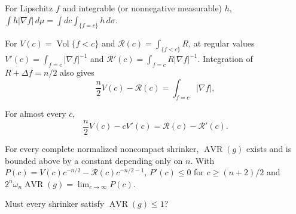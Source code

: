 \begin{proposition}
\label{prop:chow-iv-coarea}
For Lipschitz $f$ and integrable (or nonnegative measurable) $h$,
$\int h|\nabla f|\,d\mu=\int dc\int_{\{f=c\}}h\,d\sigma$.
\end{proposition}

\begin{lemma}
\label{lem:chow-iv-sublevel-derivatives}
For $V(c)=\operatorname{Vol}\{f<c\}$ and $\mathcal R(c)=\int_{\{f<c\}}R$,
at regular values $V'(c)=\int_{f=c}|\nabla f|^{-1}$ and
$\mathcal R'(c)=\int_{f=c}R|\nabla f|^{-1}$.  Integration of
$R+\Delta f=n/2$ also gives
\[
\frac n2V(c)-\mathcal R(c)=\int_{f=c}|\nabla f|,
\]
\end{lemma}

\begin{lemma}
\label{lem:chow-iv-sublevel-differential-identity}
For almost every $c$,
\[
\frac n2V(c)-cV'(c)=\mathcal R(c)-\mathcal R'(c).
\]
\end{lemma}

\begin{theorem}
\label{thm:chow-iv-avr-exists}
For every complete normalized noncompact shrinker, $\operatorname{AVR}(g)$ exists
and is bounded above by a constant depending only on $n$.  With
$P(c)=V(c)c^{-n/2}-\mathcal R(c)c^{-n/2-1}$,
$P'(c)\le0$ for $c\ge(n+2)/2$ and
$2^n\omega_n\operatorname{AVR}(g)=\lim_{c\to\infty}P(c)$.
\end{theorem}

\begin{claim}
\label{prob:chow-iv-avr-one}
Must every shrinker satisfy $\operatorname{AVR}(g)\le1$?
\end{claim}


